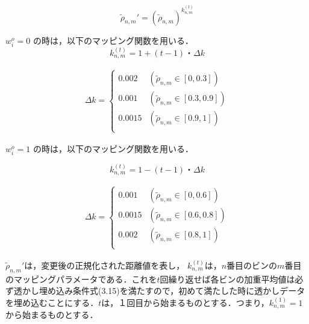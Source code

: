 \documentclass[11pt]{jreport}
\begin{document}
{\begin{equation}
\tilde{\rho}_{n,m}'=(\tilde{\rho}_{n,m})^{k_{n,m}^{(t)}}
\end{equation}


\begin{math}
w_i^o=0
\end{math}
の時は，以下のマッピング関数を用いる．
\begin{equation}
k_{n,m}^{(t)}=1+(t-1)・\Delta k
\end{equation}


\begin{eqnarray}
\Delta k=\left\{ \begin{array}{ll}
0.002 & (\tilde{\rho}_{n,m} \in [0,0.3]) \\
0.001 & (\tilde{\rho}_{n,m} \in [0.3,0.9]) \\
0.0015 & (\tilde{\rho}_{n,m} \in [0.9,1]) \\
\end{array} \right.
\end{eqnarray}


\begin{math}
w_i^o=1
\end{math}
の時は，以下のマッピング関数を用いる．


\begin{equation}
k_{n,m}^{(t)}=1-(t-1)・\Delta k
\end{equation}


\begin{eqnarray}
\Delta k=\left\{ \begin{array}{ll}
0.001 & (\tilde{\rho}_{n,m} \in [0,0.6]) \\
0.0015 & (\tilde{\rho}_{n,m} \in [0.6,0.8]) \\
0.002 & (\tilde{\rho}_{n,m} \in [0.8,1]) \\
\end{array} \right.
\end{eqnarray}

\begin{math}
\tilde{\rho}_{n,m}'
\end{math}は，変更後の正規化された距離値を表し，
\begin{math}
k_{n,m}^{(t)}
\end{math}は，\begin{math}n\end{math}番目のビンの\begin{math}m\end{math}番目のマッピングパラメータである．これを\begin{math}t\end{math}回繰り返せば各ビンの加重平均値は必ず透かし埋め込み条件式(3.15)を満たすので，初めて満たした時に透かしデータを埋め込むことにする．\begin{math}t\end{math}は，１回目から始まるものとする．つまり，\begin{math}k_{n,m}^{(1)}=1\end{math}から始まるものとする．


}
\end{document}
